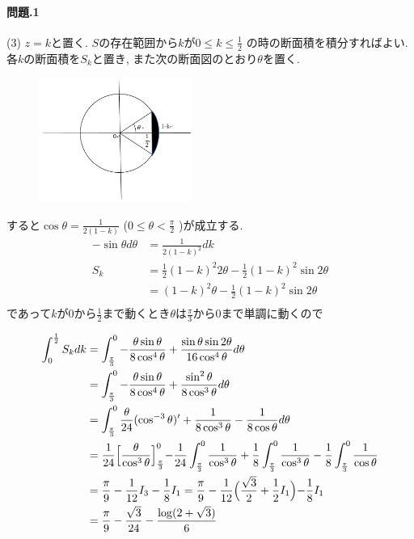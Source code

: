\documentclass[11pt]{jarticle}
\begin{document}
\title{}
\date{}
\maketitle
\paragraph{問題.1}
(3) $z=k$と置く. $S$の存在範囲から$k$が$0\leq k \leq \frac{1}{2}$
の時の断面積を積分すればよい. 各$k$の断面積を$S_k$と置き, また次の断面図のとおり$\theta$を置く.
\begin{figure}[H]
\centering
\includegraphics[width=5cm]{fig.png}
\end{figure}
すると$\cos\theta=\frac{1}{2(1-k)}$ ($0 \leq \theta < \frac{\pi}{2}$ )が成立する. 
\begin{align*}
-\sin \theta d\theta& =\frac{1}{2(1-k)^2}dk\\
 S_k & = \frac{1}{2}(1-k)^2 2\theta-\frac{1}{2}(1-k)^2\sin2\theta\\
  &=(1-k)^2\theta-\frac{1}{2}(1-k)^2\sin2\theta\\
\end{align*}
であって$k$が$0$から$\frac{1}{2}$まで動くとき$\theta$は$\frac{\pi}{3}$から$0$まで単調に動くので

\begin{align*}
  \int_0^\frac{1}{2} S_k dk&=\int_\frac{\pi}{3}^0 -\frac{\theta\sin\theta}{8\cos^4\theta}+\frac{\sin\theta\sin 2\theta}{16\cos^4\theta} d\theta\\
                                  &=\int_\frac{\pi}{3}^0 -\frac{\theta\sin\theta}{8\cos^4\theta}+\frac{\sin^2\theta}{8\cos^3\theta} d\theta\\
  &=\int_\frac{\pi}{3}^0\frac{\theta}{24}(\cos^{-3}\theta)'+\frac{1}{8\cos^3\theta}-\frac{1}{8\cos\theta} d\theta\\
  &=\frac{1}{24}\Bigl[\frac{\theta}{\cos^3\theta}\Bigl]_\frac{\pi}{3}^{0}-\frac{1}{24}\int_\frac{\pi}{3}^0\frac{1}{\cos^3\theta}+\frac{1}{8}\int_\frac{\pi}{3}^0\frac{1}{\cos^3\theta}-\frac{1}{8}\int_\frac{\pi}{3}^0\frac{1}{\cos\theta}\\
  &=\frac{\pi}{9}-\frac{1}{12}I_3-\frac{1}{8}I_1
  =\frac{\pi}{9}-\frac{1}{12}\Bigl(\frac{\sqrt3}{2}+\frac{1}{2}I_1\Bigl)-\frac{1}{8}I_1\\
&=\frac{\pi}{9}-\frac{\sqrt{3}}{24}-\frac{\log(2+\sqrt{3})}{6}
\end{align*}
\end{document}
